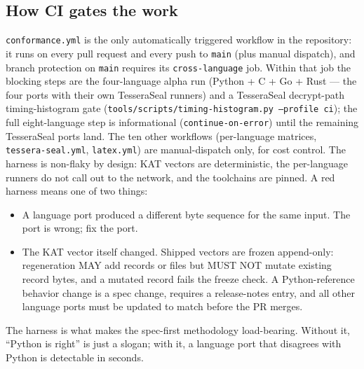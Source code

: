 \subsection{How CI gates the work}

\texttt{conformance.yml} is the only automatically triggered workflow in the repository: it runs on every pull request and every push to \texttt{main} (plus manual dispatch), and branch protection on \texttt{main} requires its \texttt{cross-language} job. Within that job the blocking steps are the four-language alpha run (Python + C + Go + Rust --- the four ports with their own TesseraSeal runners) and a TesseraSeal decrypt-path timing-histogram gate (\texttt{tools/scripts/timing-histogram.py --profile ci}); the full eight-language step is informational (\texttt{continue-on-error}) until the remaining TesseraSeal ports land. The ten other workflows (per-language matrices, \texttt{tessera-seal.yml}, \texttt{latex.yml}) are manual-dispatch only, for cost control. The harness is non-flaky by design: KAT vectors are deterministic, the per-language runners do not call out to the network, and the toolchains are pinned. A red harness means one of two things:

\begin{itemize}
\item A language port produced a different byte sequence for the same input. The port is wrong; fix the port.
\item The KAT vector itself changed. Shipped vectors are frozen append-only: regeneration MAY add records or files but MUST NOT mutate existing record bytes, and a mutated record fails the freeze check. A Python-reference behavior change is a spec change, requires a release-notes entry, and all other language ports must be updated to match before the PR merges.
\end{itemize}

The harness is what makes the spec-first methodology load-bearing. Without it, ``Python is right'' is just a slogan; with it, a language port that disagrees with Python is detectable in seconds.
